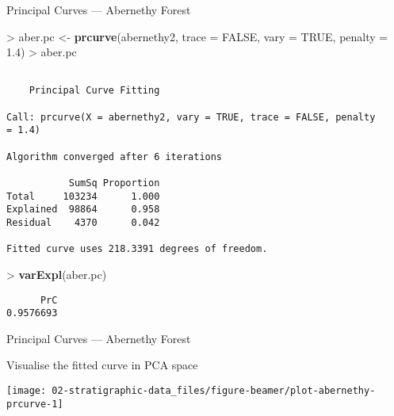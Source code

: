 \documentclass[10pt,ignorenonframetext,compress, aspectratio=169]{beamer}
\newenvironment{Shaded}{\begin{snugshade}}{\end{snugshade}}
\newcommand{\KeywordTok}[1]{\textcolor[rgb]{0.13,0.29,0.53}{\textbf{{#1}}}}
\newcommand{\DataTypeTok}[1]{\textcolor[rgb]{0.13,0.29,0.53}{{#1}}}
\newcommand{\FloatTok}[1]{\textcolor[rgb]{0.00,0.00,0.81}{{#1}}}
\newcommand{\StringTok}[1]{\textcolor[rgb]{0.31,0.60,0.02}{{#1}}}
\newcommand{\OtherTok}[1]{\textcolor[rgb]{0.56,0.35,0.01}{{#1}}}
\newcommand{\NormalTok}[1]{{#1}}
\begin{document}
\begin{frame}[fragile]{Principal Curves --- Abernethy Forest}

\begin{Shaded}
\begin{Highlighting}[]
\NormalTok{>}\StringTok{ }\NormalTok{aber.pc <-}\StringTok{ }\KeywordTok{prcurve}\NormalTok{(abernethy2, }\DataTypeTok{trace =} \OtherTok{FALSE}\NormalTok{, }\DataTypeTok{vary =} \OtherTok{TRUE}\NormalTok{, }\DataTypeTok{penalty =} \FloatTok{1.4}\NormalTok{)}
\NormalTok{>}\StringTok{ }\NormalTok{aber.pc}
\end{Highlighting}
\end{Shaded}

\begin{verbatim}

    Principal Curve Fitting

Call: prcurve(X = abernethy2, vary = TRUE, trace = FALSE, penalty
= 1.4)

Algorithm converged after 6 iterations

           SumSq Proportion
Total     103234      1.000
Explained  98864      0.958
Residual    4370      0.042

Fitted curve uses 218.3391 degrees of freedom.
\end{verbatim}

\begin{Shaded}
\begin{Highlighting}[]
\NormalTok{>}\StringTok{ }\KeywordTok{varExpl}\NormalTok{(aber.pc)}
\end{Highlighting}
\end{Shaded}

\begin{verbatim}
      PrC 
0.9576693 
\end{verbatim}

\end{frame}

\begin{frame}{Principal Curves --- Abernethy Forest}

Visualise the fitted curve in PCA space

\begin{center}\texttt{[image: 02-stratigraphic-data\_files/figure-beamer/plot-abernethy-prcurve-1]} \end{center}

\end{frame}
\end{document}
